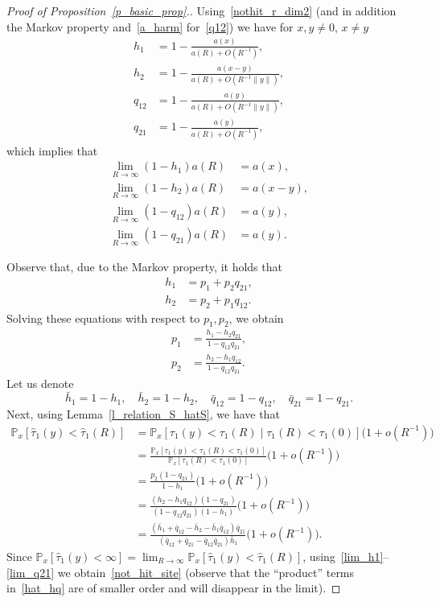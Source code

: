 \documentclass[AHL,Unicode,longabstracts]{cedram}
\newcommand{\1}[1]{{\mathbf 1}{\{#1\}}}
\newcommand{\8}{{\infty}}
\newcommand{\hh}{{\bar h}}
\newcommand{\hq}{{\bar q}}
\newcommand{\IP}{{\mathbb P}}
\newcommand{\htau}{\widehat{\tau}}
\begin{document}
\begin{proof}[Proof of Proposition~\ref{p_basic_prop}.]
Using~\eqref{nothit_r_dim2} (and in addition the Markov property and~\eqref{a_harm} for~\eqref{q12}) we have for $x,y \neq 0$, $x \neq y$
\begin{align}
h_1&=1-\frac{a(x)}{a(R)+O(R^{-1})},\label{h1}
\\
h_2&=1-\frac{a(x-y)}{a(R)+O(R^{-1}\|y\|)},\label{h2}
\\
q_{12}&=1-\frac{a(y)}{a(R)+O(R^{-1}\|y\|)},\label{q12}
\\
q_{21}&=1-\frac{a(y)}{a(R)+O(R^{-1})},\label{q21}
\end{align}
which implies that
\begin{align}
\lim_{R\to\infty} (1-h_1)a(R)&=a(x),\label{lim_h1}
\\
\lim_{R\to\infty} (1-h_2)a(R)&=a(x-y),\label{lim_h2}
\\
\lim_{R\to\infty} (1-q_{12})a(R) &= a(y),\label{lim_q12}
\\
\lim_{R\to\infty} (1-q_{21})a(R) &=a(y).\label{lim_q21}
\end{align}

Observe that, due to the Markov property, it holds that
\begin{align*}
h_1 &= p_1 + p_2q_{21},\\
h_2 &= p_2 + p_1q_{12}.
\end{align*}
Solving these equations with respect to $p_1,p_2$, we obtain
\begin{align}
p_1 &= \frac{h_1-h_2q_{21}}{1-q_{12}q_{21}},\label{expr_p1}
\\
p_2 &= \frac{h_2-h_1q_{12}}{1-q_{12}q_{21}}.\label{expr_p2}
\end{align}
Let us denote
\begin{equation}\label{bar_all}
\hh_1=1-h_1, \quad \hh_2=1-h_2,\quad
\hq_{12}=1-q_{12},\quad \hq_{21}=1-q_{21}.
\end{equation}
Next, using
Lemma~\ref{l_relation_S_hatS}, we have that
\begin{align}
\IP_x[\htau_1(y)<\htau_1(R)] &= \IP_x[\tau_1(y)<\tau_1(R)\mid \tau_1(R)<\tau_1(0)]
\big(1+o(R^{-1})\big)\nonumber\\
&=\frac{\IP_x[\tau_1(y)<\tau_1(R)<\tau_1(0)]}{\IP_x[\tau_1(R)<\tau_1(0)]}
\big(1+o(R^{-1})\big)\nonumber\\
&=\frac{p_2(1-q_{21})}{1-h_1} \big(1+o(R^{-1})\big)\nonumber\\
&= \frac{(h_2-h_1q_{12})(1-q_{21})}{(1-q_{12}q_{21})(1-h_1)}
\big(1+o(R^{-1})\big)\nonumber\\
&= \frac{(\hh_1+\hq_{12}-\hh_2-\hh_1\hq_{12})\hq_{21}} {(\hq_{12}+\hq_{21}-\hq_{12}\hq_{21})\hh_1} \big(1+o(R^{-1})\big).\label{hat_hq}
\end{align}
Since $\IP_x[\htau_1(y)<\infty]=\lim_{R\to\infty}
\IP_x[\htau_1(y)<\htau_1(R)]$, using~\eqref{lim_h1}--\eqref{lim_q21} we obtain~\eqref{not_hit_site} (observe that the ``product'' terms in~\eqref{hat_hq} are of smaller order and will disappear in the limit).
\end{proof}
\end{document}
